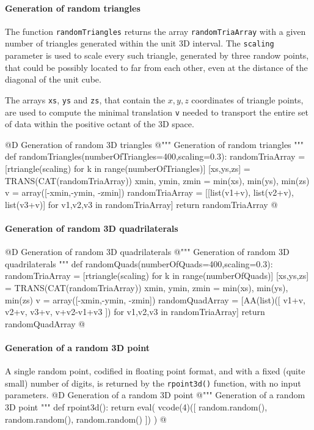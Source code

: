 \documentclass[11pt,oneside]{article}    %
\begin{document}
\paragraph{Generation of random triangles}
The function \texttt{randomTriangles} returns the array \texttt{randomTriaArray} with a given number of triangles generated within the unit 3D interval. The \texttt{scaling} parameter is used to scale every such triangle, generated by three randow points, that could be possibly located to far from each other, even at the distance of the diagonal of the unit cube.

The arrays \texttt{xs}, \texttt{ys} and \texttt{zs}, that contain the $x,y,z$ coordinates of triangle points, are used to compute the minimal translation \texttt{v} needed to transport the entire set of data within the positive octant of the 3D space. 

@D Generation of random 3D triangles
@{""" Generation of random triangles """
def randomTriangles(numberOfTriangles=400,scaling=0.3):
    randomTriaArray = [rtriangle(scaling) for k in range(numberOfTriangles)]
    [xs,ys,zs] = TRANS(CAT(randomTriaArray))
    xmin, ymin, zmin = min(xs), min(ys), min(zs)
    v = array([-xmin,-ymin, -zmin])
    randomTriaArray = [[list(v1+v), list(v2+v), list(v3+v)] for v1,v2,v3 in randomTriaArray]
    return randomTriaArray
@}

\paragraph{Generation of random 3D quadrilaterals}

@D Generation of random 3D quadrilaterals
@{""" Generation of random 3D quadrilaterals """
def randomQuads(numberOfQuads=400,scaling=0.3):
    randomTriaArray = [rtriangle(scaling) for k in range(numberOfQuads)]
    [xs,ys,zs] = TRANS(CAT(randomTriaArray))
    xmin, ymin, zmin = min(xs), min(ys), min(zs)
    v = array([-xmin,-ymin, -zmin])
    randomQuadArray = [AA(list)([ v1+v, v2+v, v3+v, v+v2-v1+v3 ]) for v1,v2,v3 in randomTriaArray]
    return randomQuadArray
@}


\paragraph{Generation of a random 3D point}
A single random point, codified in floating point format, and with a fixed (quite small) number of digits, is returned by the \texttt{rpoint3d()} function, with no input parameters.
@D Generation of a random 3D point
@{""" Generation of a random 3D point """
def rpoint3d():
    return eval( vcode(4)([ random.random(), random.random(), random.random() ]) )
@}
    
\end{document}
